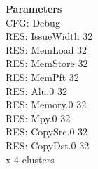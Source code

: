 \documentclass{article}
\begin{document}
\textbf{Parameters}\\

CFG: Debug \\
RES: IssueWidth 32\\
RES: MemLoad 32\\
RES: MemStore 32\\
RES: MemPft 32\\

RES: Alu.0 32 \\
RES: Memory.0 32\\ 
RES: Mpy.0 32 \\
RES: CopySrc.0 32\\ 
RES: CopyDst.0 32\\
x 4 clusters
\end{document}
